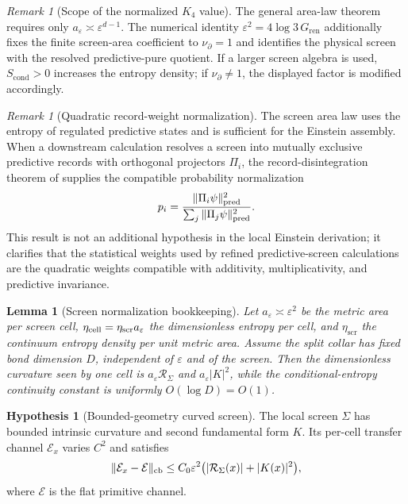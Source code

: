 \documentclass[11pt]{article}
\newtheorem{lemma}[theorem]{Lemma}
\theoremstyle{definition}
\newtheorem{hypothesis}[theorem]{Hypothesis}
\theoremstyle{remark}
\newtheorem{remark}[theorem]{Remark}
\newcommand{\eps}{\varepsilon}
\newcommand{\etaScr}{\eta_{\mathrm{scr}}}
\newcommand{\Gren}{G_{\mathrm{ren}}}
\newcommand{\Scond}{S_{\mathrm{cond}}}
\newcommand{\Npartial}{\nu_{\partial}}
\begin{document}
\begin{remark}[Scope of the normalized \(K_4\) value]
\label{rem:k4-screen-scope}
The general area-law theorem requires only \(a_\eps\asymp\eps^{d-1}\).  The
numerical identity \(\eps^2=4\log3\,\Gren\) additionally fixes the finite
screen-area coefficient to \(\Npartial=1\) and identifies the physical screen
with the resolved predictive-pure quotient.  If a larger screen algebra is
used, \(\Scond>0\) increases the entropy density; if
\(\Npartial\ne1\), the displayed factor is modified accordingly.
\end{remark}



\begin{remark}[Quadratic record-weight normalization]
\label{rem:quadratic-record-weights}
The screen area law uses the entropy of regulated predictive states and is
sufficient for the Einstein assembly.  When a downstream calculation resolves a
screen into mutually exclusive predictive records with orthogonal projectors
$\Pi_i$, the record-disintegration theorem of
\cite{PelissierBornDisintegrationArxiv} supplies the compatible probability
normalization
\[
        p_i=\frac{\|\Pi_i\psi\|_{\rm pred}^2}
        {\sum_j\|\Pi_j\psi\|_{\rm pred}^2}.
\]
This result is not an additional hypothesis in the local Einstein derivation; it
clarifies that the statistical weights used by refined predictive-screen
calculations are the quadratic weights compatible with additivity,
multiplicativity, and predictive invariance.
\end{remark}


\begin{lemma}[Screen normalization bookkeeping]
\label{lem:screen-normalization}
Let $a_\eps\asymp\eps^2$ be the metric area per screen cell,
$\eta_{\rm cell}=\etaScr a_\eps$ the dimensionless entropy per cell, and
$\etaScr$ the continuum entropy density per unit metric area.  Assume the split
collar has fixed bond dimension $D$, independent of $\eps$ and of the screen.
Then the dimensionless curvature seen by one cell is
$a_\eps\mathcal R_\Sigma$ and $a_\eps|K|^2$, while the conditional-entropy
continuity constant is uniformly $O(\log D)=O(1)$.
\end{lemma}

\begin{hypothesis}[Bounded-geometry curved screen]
\label{hyp:curved-screen}
The local screen $\Sigma$ has bounded intrinsic curvature and second fundamental
form $K$.  Its per-cell transfer channel $\mathcal E_x$ varies $C^2$ and satisfies
\[
 \|\mathcal E_x-\mathcal E\|_{\rm cb}
 \le C_0\eps^2\bigl(|\mathcal R_\Sigma(x)|+|K(x)|^2\bigr),
\]
where $\mathcal E$ is the flat primitive channel.
\end{hypothesis}
\end{document}
